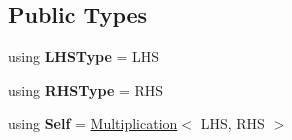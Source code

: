 \subsection*{Public Types}
\begin{DoxyCompactItemize}
\item 
\hypertarget{classlatex_1_1math_1_1Multiplication_a78215162923b7966cae1e4a360560668}{using {\bfseries L\-H\-S\-Type} = L\-H\-S}\label{classlatex_1_1math_1_1Multiplication_a78215162923b7966cae1e4a360560668}

\item 
\hypertarget{classlatex_1_1math_1_1Multiplication_ad505c00cdcc46719478e3199854f2b0b}{using {\bfseries R\-H\-S\-Type} = R\-H\-S}\label{classlatex_1_1math_1_1Multiplication_ad505c00cdcc46719478e3199854f2b0b}

\item 
\hypertarget{classlatex_1_1math_1_1Multiplication_a6e50f629d0cd2719816ca3b6b80fefd0}{using {\bfseries Self} = \hyperlink{classlatex_1_1math_1_1Multiplication}{Multiplication}$<$ L\-H\-S, R\-H\-S $>$}\label{classlatex_1_1math_1_1Multiplication_a6e50f629d0cd2719816ca3b6b80fefd0}

\end{DoxyCompactItemize}
